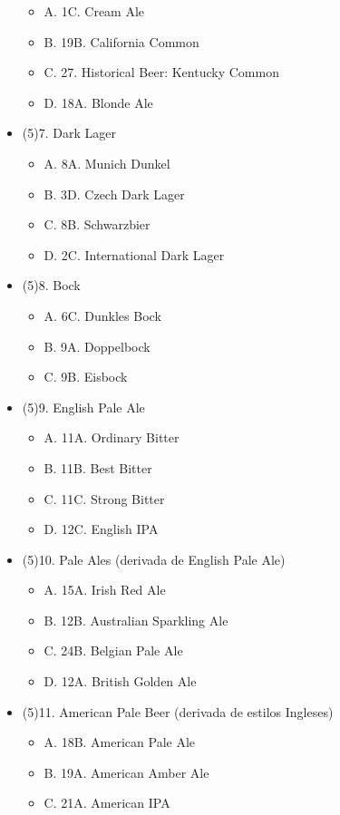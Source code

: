 \begin{multicols*}{2}
\begin{itemize}[noitemsep]
\begin{itemize}
  \item[] A. 1C. Cream Ale
  \item[] B. 19B. California Common
  \item[] C. 27. Historical Beer: Kentucky Common
  \item[] D. 18A. Blonde Ale
\end{itemize}
\item[] (5)7. Dark Lager
\begin{itemize}
  \item[] A. 8A. Munich Dunkel
  \item[] B. 3D. Czech Dark Lager
  \item[] C. 8B. Schwarzbier
  \item[] D. 2C. International Dark Lager
\end{itemize}
\item[] (5)8. Bock
\begin{itemize}
  \item[] A. 6C. Dunkles Bock
  \item[] B. 9A. Doppelbock
  \item[] C. 9B. Eisbock
\end{itemize}
\item[] (5)9. English Pale Ale
\begin{itemize}
  \item[] A. 11A. Ordinary Bitter
  \item[] B. 11B. Best Bitter
  \item[] C. 11C. Strong Bitter
  \item[] D. 12C. English IPA
\end{itemize}
\item[] (5)10. Pale Ales (derivada de English Pale Ale)
\begin{itemize}
  \item[] A. 15A. Irish Red Ale
  \item[] B. 12B. Australian Sparkling Ale
  \item[] C. 24B. Belgian Pale Ale
  \item[] D. 12A. British Golden Ale
\end{itemize}
\item[] (5)11. American Pale Beer (derivada de estilos Ingleses)
\begin{itemize}
  \item[] A. 18B. American Pale Ale
  \item[] B. 19A. American Amber Ale
  \item[] C. 21A. American IPA
\end{itemize}

\end{itemize}
\end{multicols*}
